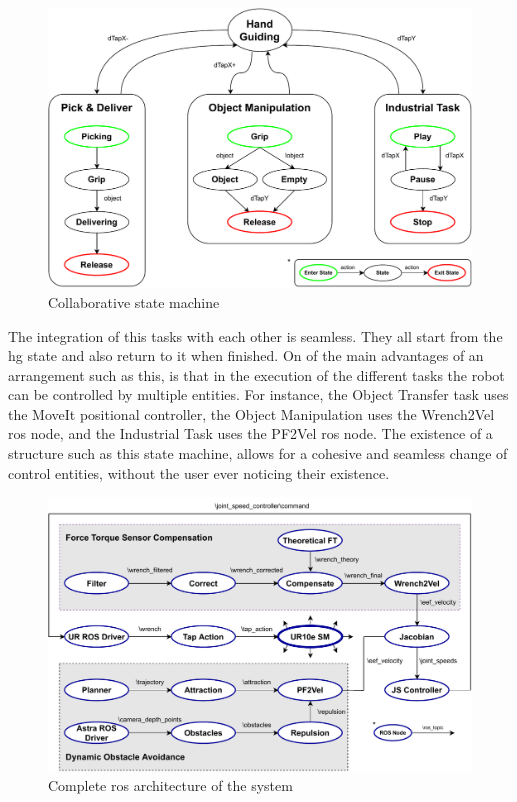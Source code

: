 \begin{figure}[h]
    \centering
    \includegraphics[width=0.8\linewidth]{figs/chp5/ros_ur10e_smach.pdf}
    \caption{Collaborative state machine}
    \label{fig:ros_smach}
\end{figure}

\par The integration of this tasks with each other is seamless. They all start from the \ac{hg} state and also return to it when finished. On of the main advantages of an arrangement such as this, is that in the execution of the different tasks the robot can be controlled by multiple entities. For instance, the Object Transfer task uses the MoveIt positional controller, the Object Manipulation uses the Wrench2Vel \ac{ros} node, and the Industrial Task uses the PF2Vel \ac{ros} node. The existence of a structure such as this state machine, allows for a cohesive and seamless change of control entities, without the user ever noticing their existence.

\begin{figure}[h]
    \centering
    \includegraphics[width=\linewidth]{figs/chp5/ros_cobot_arch.pdf}
    \caption{Complete \ac{ros} architecture of the system}
    \label{fig:ros_cobot_arch}
\end{figure}

